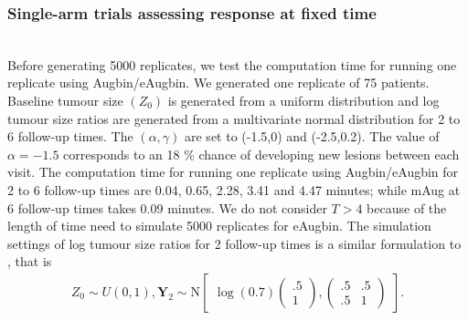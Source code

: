 \documentclass[10pt,A4]{article}
\begin{document}
\subsubsection{Single-arm trials assessing response at fixed time}\label{simulation-singlearm} ~\\ 
Before generating 5000 replicates, we test the computation time for running one replicate using Augbin/eAugbin. We generated one replicate of 75 patients. Baseline tumour size $(Z_0)$ is generated from a uniform distribution and log tumour size ratios are generated from a multivariate normal distribution for 2 to 6 follow-up times. The $(\alpha, \gamma)$ are set to (-1.5,0) and (-2.5,0.2). The value of $\alpha=-1.5$ corresponds to an 18 \% chance of developing new lesions between each visit. The computation time for running one replicate using Augbin/eAugbin for 2 to 6 follow-up times are 0.04, 0.65, 2.28, 3.41 and 4.47 minutes; while mAug at 6 follow-up times takes 0.09 minutes. We do not consider $T>4$ because of the length of time need to simulate 5000 replicates for eAugbin. The simulation settings of log tumour size ratios for 2 follow-up times is a similar formulation to \cite{Wason2013}, that is
\begin{align*}
Z_0 \sim U(0,1),\textbf{Y}_{2}\sim  \text{N}
\begin{bmatrix}
\log(0.7)
\begin{pmatrix}
.5\\
1
\end{pmatrix}\!\!,
\begin{pmatrix}
.5 & .5 \\
.5 & 1
\end{pmatrix}
\end{bmatrix}.\\
\end{align*}
\end{document}
